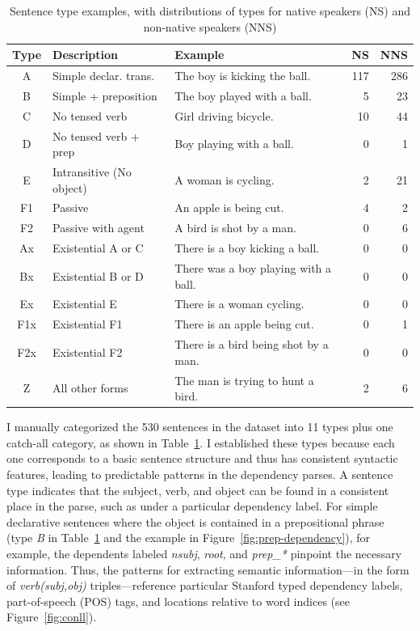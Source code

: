 \begin{table}[htb!]
\begin{center}
\begin{tabular}{|c|l|l|r|r|}
\hline
Type & Description & Example & NS & NNS \\
\hline
 A & Simple declar. trans. & The boy is kicking the ball. & 117 & 286 \\
 \hline
 B & Simple + preposition & The boy played with a ball. & 5 & 23 \\
 \hline
 C & No tensed verb & Girl driving bicycle. & 10 & 44 \\
 \hline
 D & No tensed verb + prep & Boy playing with a ball. & 0 & 1 \\
 \hline
 E & Intransitive (No object) & A woman is cycling. & 2 & 21 \\
 \hline
 F1 & Passive & An apple is being cut. & 4 & 2 \\
 \hline
 F2 & Passive with agent & A bird is shot by a man. & 0 & 6 \\
 \hline
 Ax & Existential A or C & There is a boy kicking a ball. & 0 & 0 \\
 \hline
 Bx & Existential B  or D & There was a boy playing with a ball. & 0 & 0 \\
 \hline
 Ex & Existential E & There is a woman cycling. & 0 & 0 \\
 \hline
 F1x & Existential F1 & There is an apple being cut. & 0 & 1 \\
 \hline
 F2x & Existential F2 & There is a bird being shot by a man. & 0 & 0 \\
 \hline
 Z & All other forms & The man is trying to hunt a bird. & 2 & 6 \\
 \hline
\end{tabular}
\end{center}
\caption{Sentence type examples, with distributions of types for
  native speakers (NS) and non-native speakers (NNS)}
\label{tab:sentence-type}
\end{table}


I manually categorized the 530 sentences in the dataset into 11 types plus one catch-all category, as shown in
Table~\ref{tab:sentence-type}. I established these types because each
one corresponds to a basic sentence structure and thus has consistent
syntactic features, leading to predictable patterns in the dependency
parses. A sentence type indicates that the subject,
verb, and object can be found in a consistent place in the parse,
such as under a particular dependency label.
For simple declarative sentences where the object is contained in a prepositional phrase (type \textit{B} in Table~\ref{tab:sentence-type} and the example in Figure~\ref{fig:prep-dependency}), for example, the dependents labeled \textit{nsubj}, \textit{root}, and \textit{prep\_\**} 
pinpoint the necessary information.
Thus, the patterns for extracting semantic information---in the form
of \textit{verb(subj,obj)} triples---reference particular Stanford
typed dependency labels, part-of-speech (POS) tags, and locations
relative to word indices (see Figure~\ref{fig:conll}).


